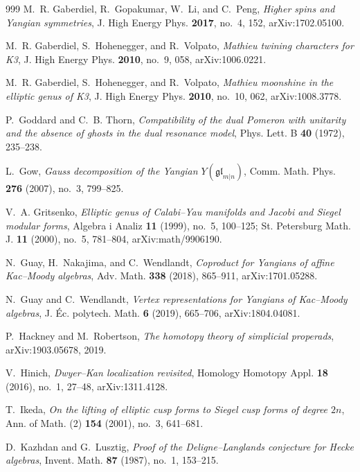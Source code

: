 \documentclass[11pt]{memoir}
\begin{document}
\begin{thebibliography}{999}
M.~R. Gaberdiel, R.~Gopakumar, W.~Li, and C.~Peng, \emph{Higher spins and Yangian symmetries}, J. High Energy Phys. \textbf{2017}, no.~4, 152, arXiv:1702.05100.

M.~R. Gaberdiel, S.~Hohenegger, and R.~Volpato, \emph{Mathieu twining characters for K3}, J. High Energy Phys. \textbf{2010}, no.~9, 058, arXiv:1006.0221.

M.~R. Gaberdiel, S.~Hohenegger, and R.~Volpato, \emph{Mathieu moonshine in the elliptic genus of K3}, J. High Energy Phys. \textbf{2010}, no.~10, 062, arXiv:1008.3778.

P.~Goddard and C.~B. Thorn, \emph{Compatibility of the dual Pomeron with unitarity and the absence of ghosts in the dual resonance model}, Phys. Lett. B \textbf{40} (1972), 235--238.

L.~Gow, \emph{Gauss decomposition of the Yangian $Y(\mathfrak{gl}_{m|n})$}, Comm. Math. Phys. \textbf{276} (2007), no.~3, 799--825.

V.~A. Gritsenko, \emph{Elliptic genus of Calabi--Yau manifolds and Jacobi and Siegel modular forms}, Algebra i Analiz \textbf{11} (1999), no.~5, 100--125; St. Petersburg Math. J. \textbf{11} (2000), no.~5, 781--804, arXiv:math/9906190.

N.~Guay, H.~Nakajima, and C.~Wendlandt, \emph{Coproduct for Yangians of affine Kac--Moody algebras}, Adv. Math. \textbf{338} (2018), 865--911, arXiv:1701.05288.

N.~Guay and C.~Wendlandt, \emph{Vertex representations for Yangians of Kac--Moody algebras}, J. \'Ec. polytech. Math. \textbf{6} (2019), 665--706, arXiv:1804.04081.

P.~Hackney and M.~Robertson, \emph{The homotopy theory of simplicial properads}, arXiv:1903.05678, 2019.

V.~Hinich, \emph{Dwyer--Kan localization revisited}, Homology Homotopy Appl. \textbf{18} (2016), no.~1, 27--48, arXiv:1311.4128.

T.~Ikeda, \emph{On the lifting of elliptic cusp forms to Siegel cusp forms of degree $2n$}, Ann. of Math. (2) \textbf{154} (2001), no.~3, 641--681.

D.~Kazhdan and G.~Lusztig, \emph{Proof of the Deligne--Langlands conjecture for Hecke algebras}, Invent. Math. \textbf{87} (1987), no.~1, 153--215.


\end{thebibliography}
\end{document}
